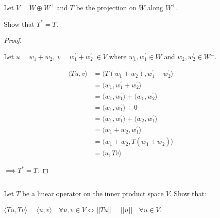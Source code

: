 \documentclass{article}
\newenvironment{customthm}[1]
  {\renewcommand\theinnercustomthm{#1}\innercustomthm}
  {\endinnercustomthm}
\begin{document}
\begin{customthm}{10}[2023.S(3.B)]
  $ $

  Let $V = W \oplus W^\perp$ and $T$ be the projection on $W$ along $W^\perp$.
  
  Show that $T^* = T$.
\end{customthm}

\begin{proof}
  $ $

  Let $u = w_1 + w_2,\ v = w^\prime_1 + w^\prime_2 \ \in V$ where $w_1, w^\prime_1 \in W$ and $w_2, w^\prime_2 \in W^\perp$.

  \begin{align*}
      \langle
        Tu,v
      \rangle 
      &= 
      \langle
        T(w_1 + w_2), w^\prime_1 + w^\prime_2
      \rangle &&\\
      &= 
      \langle
        w_1, w^\prime_1 + w^\prime_2
      \rangle &&\\
      &= 
      \langle
        w_1, w^\prime_1
      \rangle
      +
      \langle
        w_1, w^\prime_2
      \rangle &&\\
      &=
      \langle
        w_1, w^\prime_1
      \rangle
      + 0 &&\\
      &=
      \langle
        w_1, w^\prime_1
      \rangle
      + 
      \langle 
        w_2, w^\prime_1
      \rangle &&\\
      &=
      \langle
        w_1 + w_2, w^\prime_1
      \rangle &&\\
      &= 
      \langle
        w_1 + w_2, T(w^\prime_1 + w^\prime_2)
      \rangle &&\\
      &= 
      \langle
        u, Tv
      \rangle
  \end{align*}

  $\implies T^* = T$.

\end{proof}
\newpage


\begin{customthm}{11}[2023.S(3.C)]
  $ $

  Let $T$ be a linear operator on the inner product space $V$. Show that:

  $\langle
    Tu, Tv
  \rangle 
  =
  \langle
    u, v
  \rangle 
  \quad \forall u,v \in V \iff ||Tu|| = ||u|| \quad \forall u \in V$.
\end{customthm}
\end{document}
